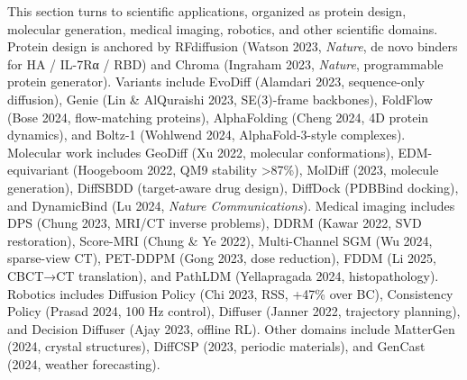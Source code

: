 This section turns to scientific applications, organized as protein design, molecular generation, medical imaging, robotics, and other scientific domains. Protein design is anchored by RFdiffusion (Watson 2023, \emph{Nature}, de novo binders for HA / IL-7Rα / RBD) and Chroma (Ingraham 2023, \emph{Nature}, programmable protein generator). Variants include EvoDiff (Alamdari 2023, sequence-only diffusion), Genie (Lin \& AlQuraishi 2023, SE(3)-frame backbones), FoldFlow (Bose 2024, flow-matching proteins), AlphaFolding (Cheng 2024, 4D protein dynamics), and Boltz-1 (Wohlwend 2024, AlphaFold-3-style complexes). Molecular work includes GeoDiff (Xu 2022, molecular conformations), EDM-equivariant (Hoogeboom 2022, QM9 stability \textgreater87\%), MolDiff (2023, molecule generation), DiffSBDD (target-aware drug design), DiffDock (PDBBind docking), and DynamicBind (Lu 2024, \emph{Nature Communications}). Medical imaging includes DPS (Chung 2023, MRI/CT inverse problems), DDRM (Kawar 2022, SVD restoration), Score-MRI (Chung \& Ye 2022), Multi-Channel SGM (Wu 2024, sparse-view CT), PET-DDPM (Gong 2023, dose reduction), FDDM (Li 2025, CBCT→CT translation), and PathLDM (Yellapragada 2024, histopathology). Robotics includes Diffusion Policy (Chi 2023, RSS, +47\% over BC), Consistency Policy (Prasad 2024, 100 Hz control), Diffuser (Janner 2022, trajectory planning), and Decision Diffuser (Ajay 2023, offline RL). Other domains include MatterGen (2024, crystal structures), DiffCSP (2023, periodic materials), and GenCast (2024, weather forecasting).

